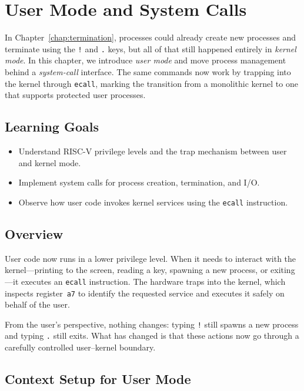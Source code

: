 \chapter{User Mode and System Calls}
\label{chap:user-mode}

In Chapter~\ref{chap:termination}, processes could already create new processes
and terminate using the \texttt{!} and \texttt{.} keys, but all of that still
happened entirely in \emph{kernel mode}.  In this chapter, we introduce
\emph{user mode} and move process management behind a \emph{system-call}
interface.  The same commands now work by trapping into the kernel through
\texttt{ecall}, marking the transition from a monolithic kernel to one that
supports protected user processes.

\section{Learning Goals}

\begin{itemize}
  \item Understand RISC-V privilege levels and the trap mechanism between
        user and kernel mode.
  \item Implement system calls for process creation, termination, and I/O.
  \item Observe how user code invokes kernel services using the \texttt{ecall}
        instruction.
\end{itemize}

\section{Overview}

User code now runs in a lower privilege level.  When it needs to interact with
the kernel—printing to the screen, reading a key, spawning a new process, or
exiting—it executes an \texttt{ecall} instruction.  
The hardware traps into the kernel, which inspects register~\texttt{a7} to
identify the requested service and executes it safely on behalf of the user.

From the user's perspective, nothing changes: typing \texttt{!} still spawns a
new process and typing \texttt{.} still exits.  What has changed is that these
actions now go through a carefully controlled user–kernel boundary.

\section{Context Setup for User Mode}

